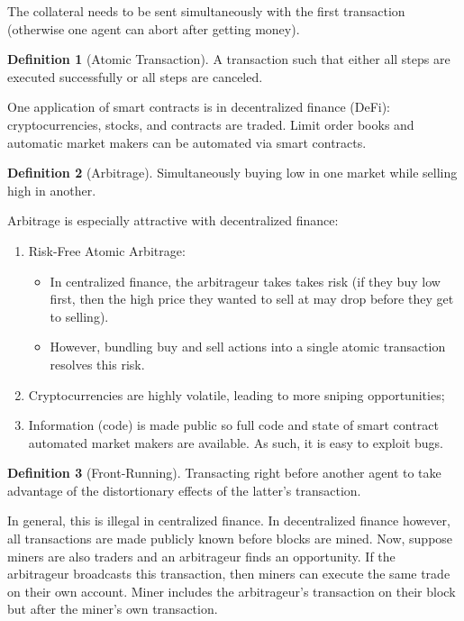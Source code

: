 \documentclass[dvipsnames]{article}
\theoremstyle{definition}
\newtheorem{definition}{Definition}[section]
\theoremstyle{remark}
\begin{document}
The collateral needs to be sent simultaneously with the first transaction (otherwise one agent can abort after getting money). 

\begin{definition}[Atomic Transaction]
	A transaction such that either all steps are executed successfully or all steps are canceled.
\end{definition}

One application of smart contracts is in decentralized finance (DeFi): cryptocurrencies, stocks, and contracts are traded. Limit order books and automatic market makers can be automated via smart contracts. 

\begin{definition}[Arbitrage]
	Simultaneously buying low in one market while selling high in another.
\end{definition}

Arbitrage is especially attractive with decentralized finance: 
\begin{enumerate}
	\item Risk-Free Atomic Arbitrage:
	\begin{itemize}
		\item In centralized finance, the arbitrageur takes takes risk (if they buy low first, then the high price they wanted to sell at may drop before they get to selling).
		\item However, bundling buy and sell actions into a single atomic transaction resolves this risk.
	\end{itemize}
	\item Cryptocurrencies are highly volatile, leading to more sniping opportunities;
	\item Information (code) is made public so full code and state of smart contract automated market makers are available. As such, it is easy to exploit bugs.
\end{enumerate}

\begin{definition}[Front-Running]
	Transacting right before another agent to take advantage of the distortionary effects of the latter's transaction.
\end{definition}

In general, this is illegal in centralized finance. In decentralized finance however, all transactions are made publicly known before blocks are mined. Now, suppose miners are also traders and an arbitrageur finds an opportunity. If the arbitrageur broadcasts this transaction, then miners can execute the same trade on their own account. Miner includes the arbitrageur's transaction on their block but after the miner's own transaction. 
\end{document}
